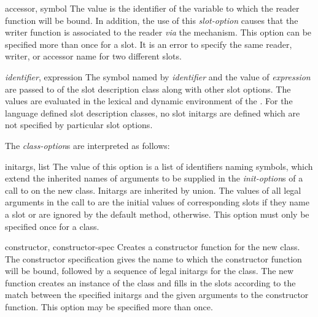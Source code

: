 \begin{optDefinition}
\begin{options}
    \item[accessor, symbol]%
    The value is the identifier of the variable to which the reader function
    will be bound. In addition, the use of this {\em slot-option} causes that
    the writer function is associated to the reader {\em via} the
     mechanism. This option can be specified more than once
    for a slot. It is an error to specify the same reader, writer, or accessor
    name for two different slots.


    \item[{\em identifier}, expression]%
    The symbol named by {\em identifier} and the value of {\em expression} are
    passed to  of the slot description class along with other
    slot options.  The values are evaluated in the lexical and dynamic
    environment of the .  For the language defined slot
    description classes, no slot initargs are defined which are not specified by
    particular  slot options.
\end{options}
%
The {\em class-option}\/s are interpreted as follows:
\begin{options}
    \item[initargs, list]%
    The value of this option is a list of identifiers naming symbols, which
    extend the inherited names of arguments to be supplied in the {\em
        init-option\/}s of a call to  on the new class.
    Initargs are inherited by union. The values of all legal arguments in the
    call to  are the initial values of corresponding slots if
    they name a slot or are ignored by the default 
    method, otherwise. This option must only be specified once for a
    class.  %

    \item[constructor, constructor-spec]%
    Creates a constructor function for the new class.  The constructor
    specification gives the name to which the constructor function will be
    bound, followed by a sequence of legal initargs for the class.  The new
    function creates an instance of the class and fills in the slots according
    to the match between the specified initargs and the given arguments to the
    constructor function.  This option may be specified more than once.


\end{options}
\end{optDefinition}
